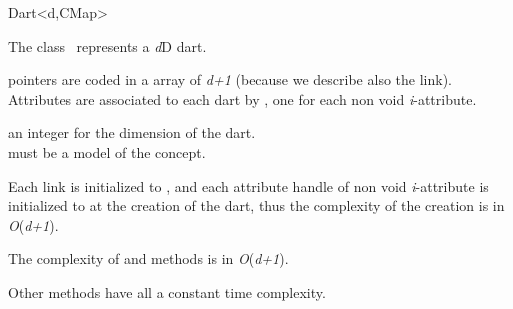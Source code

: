 \ccRefPageBegin
\begin{ccRefClass}{Dart<d,CMap>}


\ccDefinition
  
The class \ccRefName\ represents a \emph{d}D dart.

\betai{} pointers are coded in a array of \emph{d+1} 
(because we describe also the \betazero{} link).  Attributes are
associated to each dart by , one for each
non void \emph{i}-attribute.

\ccIsModel
{}

\ccParameters
{} an integer for the dimension of the dart.\\
 must be a model of the  concept.


\ccTypes
{}
\ccGlue
{}

\ccGlue
{}


Each \betai{} link is initialized to , and each 
attribute handle of non void \emph{i}-attribute is initialized to 
at the creation of the dart, thus the complexity of the creation is in
\emph{O}(\emph{d+1}).

The complexity of  and  methods is in
\emph{O}(\emph{d+1}).

Other methods have all a constant time complexity.

\ccSeeAlso
{}

\end{ccRefClass}
\ccRefPageEnd
